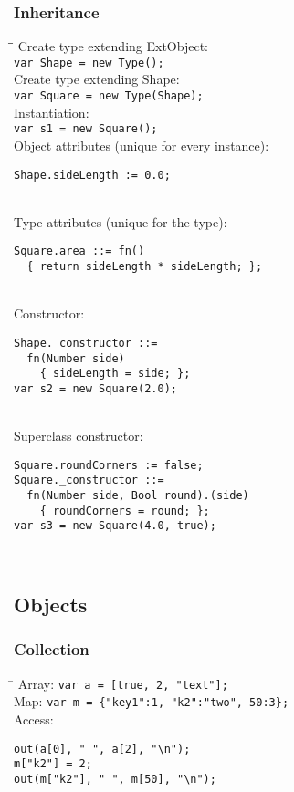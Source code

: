 \documentclass[paper=A4,paper=landscape,pagesize,9pt,DIV=30]{scrartcl}
\begin{document}
\begin{multicols}{3}
\subsubsection*{Inheritance}
\begin{tabbing}
\hspace{0.25cm}\=\hspace{1.5cm}\= \kill
Create type extending ExtObject:	\\\>\lstinline!var Shape = new Type();! \\
Create type extending Shape: 		\\\>\lstinline!var Square = new Type(Shape);! \\
Instantiation:						\\\>\lstinline!var s1 = new Square();! \\
Object attributes (unique for every instance): \\
\>\begin{lstlisting}
Shape.sideLength := 0.0;
\end{lstlisting} \\
Type attributes (unique for the type): \\
\>\begin{lstlisting}
Square.area ::= fn()
  { return sideLength * sideLength; };
\end{lstlisting} \\
Constructor: \\
\>\begin{lstlisting}
Shape._constructor ::= 
  fn(Number side)
	{ sideLength = side; };
var s2 = new Square(2.0);
\end{lstlisting} \\
Superclass constructor: \\
\>\begin{lstlisting}
Square.roundCorners := false;
Square._constructor ::= 
  fn(Number side, Bool round).(side)
  	{ roundCorners = round; };
var s3 = new Square(4.0, true);
\end{lstlisting} \\
\end{tabbing}
\subsection*{Objects}
\subsubsection*{Collection}
\begin{tabbing}
\hspace{1.75cm}\=\kill
Array: 		\>\lstinline!var a = [true, 2, "text"];! \\
Map: 		\>\lstinline!var m = {"key1":1, "k2":"two", 50:3};! \\
Access:
\>\begin{lstlisting}
out(a[0], " ", a[2], "\n");
m["k2"] = 2;
out(m["k2"], " ", m[50], "\n");
\end{lstlisting}
\end{tabbing}

\end{multicols}
\end{document}
